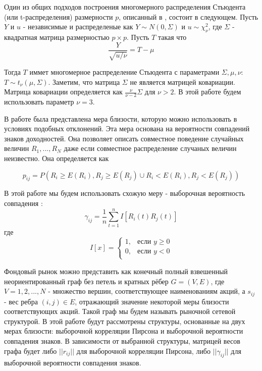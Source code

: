 Один из общих подходов построения многомерного распределения Стьюдента (или t-распределения) размерности $p$, описанный в \cite{t-distrib}, состоит в следующем. Пусть $Y$ и $u$ - независимые и распределеные как $Y \sim N(0, \Sigma)$ и $u\sim\chi_\nu^2$, где $\Sigma$ - квадратная матрица размерностью $p \times p$. Пусть $T$ такая что
\begin{equation}
  \frac{Y}{\sqrt{u/\nu}} = T - \mu 
  \label{eq:student}
\end{equation}

Тогда $T$ иммет многомерное распределение Стьюдента с параметрами $\Sigma, \mu, \nu$:  $T \sim t_\nu(\mu, \Sigma)$. Заметим, что матрица $\Sigma$ не является матрицей ковариации. Матрица ковариации определяется как $\frac{\nu}{\nu-2}\Sigma$ для $\nu > 2$. В этой работе будем использовать параметр $\nu = 3$.
	
	
В работе \cite{signs} была представлена мера близости, которую можно использовать  в условиях подобных отклонений. Эта мера основана на вероятности совпадений знаков доходностей. Она позволяет описать совместное поведение случайных величин $R_1, ..., R_N$ даже если совместное распределение случаных величин неизвестно. Она определяется как

\begin{equation}
	p_{i j} = P(R_i \geq E(R_i), R_j \geq E(R_j) \cup R_i < E(R_i), R_j < E(R_j))
\end{equation}

В этой работе мы будем использовать схожую меру - выборочная вероятность совпадения :
\begin{equation}
	\gamma_{i j} = \frac{1}{n}\sum_{t=1}^{n}I[R_i(t)R_j(t)]
\end{equation}
где 
\begin{equation*}
  I[x] =
    \begin{cases}
      1, & \text{если $y \geq 0 $}\\
      0, & \text{если $y < 0 $}\\
    \end{cases}       
\end{equation*}


Фондовый рынок можно представить как конечный полный взвешенный неориентированный граф без петель и кратных рёбер $G=(V,E)$, где $V={1,2,...,N}$  - множество вершин, соответствующее наименованиям акций, а $s_{i j}$ - вес ребра $(i,j) \in E$, отражающий значение некоторой меры близости соответствующих акций. Такой граф мы будем называть рыночной сетевой структурой. В этой работе будут рассмотрены структуры, основанные на двух мерах близости: выборочной корреляции Пирсона и выборочной вероятности совпадения знаков.  В зависимости от выбранной структуры, матрицей весов графа будет либо $||r_{i j}||$  для выборочной корреляции Пирсона, либо $||\gamma_{i j}||$  для выборочной вероятности совпадения знаков.


